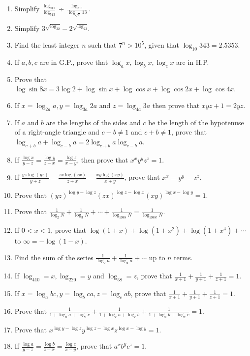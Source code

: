 \begin{enumerate}
\item Simplify $\frac{\log_911}{\log_513}\div\frac{\log_311}{\log_{\sqrt{5}}13}$.
\item Simplify $3^{\sqrt{\log_32}} - 2^{\sqrt{\log_23}}$.
\item Find the least integer $n$ such that $7^n > 10^5$, given that $\log_{10}343 = 2.5353$.
\item If $a, b, c$ are in G.P., prove that $\log_ax, \log_bx, \log_cx$ are in H.P.
\item Prove that $\log\sin8x = 3\log2 + \log\sin x + \log\cos x + \log\cos2x + \log\cos4x$.
\item If $x = \log_{2a}a, y = \log_{3a}2a$ and $z = \log_{4a}3a$ then prove that $xyz + 1 = 2yz$.
\item If $a$ and $b$ are the lengths of the sides and $c$ be the length of the hypotenuse of a right-angle triangle and $c - b \neq
  1$ and $c + b\neq 1$, prove that $\log_{c + b}a + \log_{c - b}a = 2\log_{c + b}a\log_{c - b}a$.
\item If $\frac{\log x}{y - z} = \frac{\log y}{z - x} = \frac{\log z}{x - y}$, then prove that $x^xy^yz^z = 1$.
\item If $\frac{yz\log(yz)}{y + z} = \frac{zx\log(zx)}{z + x} = \frac{xy\log(xy)}{x + y}$, prove that $x^x = y^y = z^z$.
\item Prove that $(yz)^{\log y - \log z}(zx)^{\log z - \log x}(xy)^{\log x - \log y} = 1$.
\item Prove that $\frac{1}{\log_2N} + \frac{1}{\log_3N} + \cdots + \frac{1}{\log_{1988}N} = \frac{1}{\log_{1988!}N}$.
\item If $0<x<1$, prove that $\log(1 + x) + \log(1 + x^2) + \log(1 + x^4) + \cdots$ to $\infty = -\log(1 - x)$.
\item Find the sum of the series $\frac{1}{\log_2a} + \frac{1}{\log_4a} + \cdots$ up to $n$ terms.
\item If $\log_410 = x, \log_220 = y$ and $\log_58 = z$, prove that $\frac{1}{x + 1} + \frac{1}{y + 1} + \frac{1}{z + 1} = 1$.
\item If $x = \log_abc, y = \log_bca, z = \log_cab$, prove that $\frac{1}{x + 1} + \frac{1}{y + 1} + \frac{1}{z + 1} = 1$.
\item Prove that $\frac{1}{1 + \log_ba + \log_bc} + \frac{1}{1 + \log_ca + \log_cb} + \frac{1}{1 + \log_ab + \log_ac} = 1$.
\item Prove that $x^{\log y - \log z}y^{\log z - \log x}z^{\log x - \log y} = 1$.
\item If $\frac{\log a}{y - z} = \frac{\log b}{z - x} = \frac{\log c}{x - y}$, prove that $a^xb^yc^z = 1$.

\end{enumerate}

